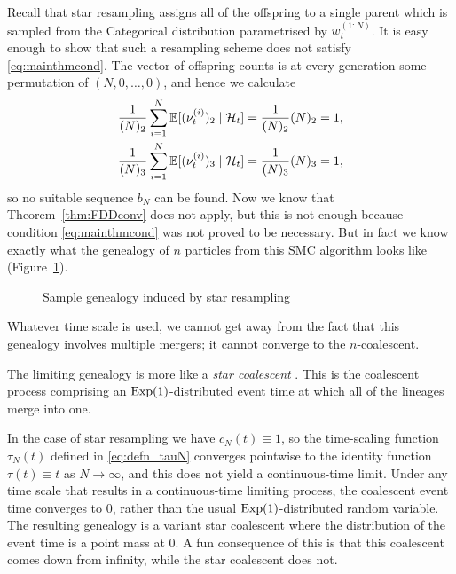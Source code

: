 Recall that star resampling assigns all of the offspring to a single parent which is sampled from the Categorical distribution parametrised by $w_t^{(1:N)}$.
It is easy enough to show that such a resampling scheme does not satisfy \eqref{eq:mainthmcond}.
The vector of offspring counts is at every generation some permutation of $(N,0,\dots,0)$, and hence we calculate
\begin{align*}
\frac{1}{(N)_2} \sum_{i=1}^N \mathbb{E}[ (\nu_t^{(i)})_2 \mid \mathcal{H}_t ]
&= \frac{1}{(N)_2} (N)_2 = 1 , \\
\frac{1}{(N)_3} \sum_{i=1}^N \mathbb{E}[ (\nu_t^{(i)})_3 \mid \mathcal{H}_t ]
&= \frac{1}{(N)_3} (N)_3 = 1 ,
\end{align*}
so no suitable sequence $b_N$ can be found.
Now we know that Theorem~\ref{thm:FDDconv} does not apply, but this is not enough because condition \eqref{eq:mainthmcond} was not proved to be necessary.
But in fact we know exactly what the genealogy of $n$ particles from this SMC algorithm looks like (Figure~\ref{fig:star_genealogy}).
\begin{figure}[ht]
\centering
{}
\caption{Sample genealogy induced by star resampling}
\label{fig:star_genealogy}
\end{figure}
Whatever time scale is used, we cannot get away from the fact that this genealogy involves multiple mergers; it cannot converge to the $n$-coalescent.

The limiting genealogy is more like a \emph{star coalescent} \parencite{pitman1999, griffiths2016}. This is the coalescent process comprising an $\operatorname{Exp}(1)$-distributed event time at which all of the lineages merge into one.

In the case of star resampling we have $c_N(t) \equiv 1$, so the time-scaling function $\tau_N(t)$ defined in \eqref{eq:defn_tauN} converges pointwise to the identity function $\tau(t) \equiv t$ as $N\to\infty$, and this does not yield a continuous-time limit.
Under any time scale that results in a continuous-time limiting process, the coalescent event time converges to $0$, rather than the usual $\operatorname{Exp}(1)$-distributed random variable. The resulting genealogy is a variant star coalescent where the distribution of the event time is a point mass at $0$. A fun consequence of this is that this coalescent comes down from infinity, while the star coalescent does not.






